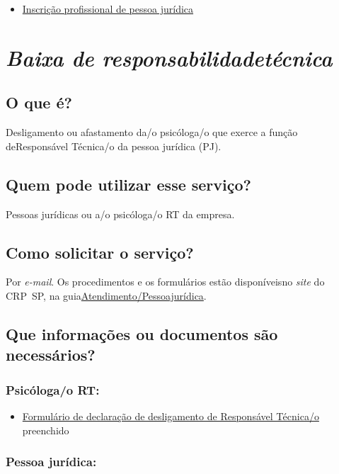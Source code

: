 \begin{itemize}
  \item  \hyperref[]{Inscrição  profissional de pessoa jurídica}
\end{itemize}

\chapter{\texorpdfstring{\emph{Baixa de responsabilidadetécnica}}{Baixa de responsabilidade técnica}}


\section{O que é?}

Desligamento ou afastamento da/o psicóloga/o que exerce a função deResponsável Técnica/o da pessoa jurídica (PJ).

\section{Quem pode utilizar esse serviço?}

Pessoas jurídicas ou a/o psicóloga/o RT da empresa.

\section{Como solicitar o serviço?}

Por \emph{e-mail}. Os procedimentos e os formulários estão disponíveisno \emph{site} do CRP~SP, na guia\href{https://www.crpsp.org/pagina/view/30}{Atendimento/Pessoajurídica}.

\section{Que informações ou documentos são necessários?}

\subsection{Psicóloga/o RT:}

\begin{itemize}
  \item  \hyperref[]{Formulário  de declaração de desligamento de Responsável Técnica/o} preenchido
\end{itemize}

\subsection{Pessoa jurídica:}

